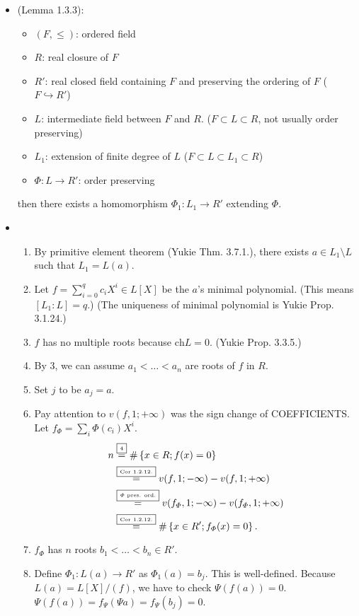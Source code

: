 \documentclass[9pt]{ltjsarticle}
\begin{document}
\begin{itemize}
  \item (Lemma 1.3.3):
  \begin{itemize}
    \item $(F,\le)$: ordered field
    \item $R$: real closure of $F$
    \item $R'$: real closed field containing $F$ and preserving the ordering of $F$
    ($F \hookrightarrow R'$)
    \item $L$: intermediate field between $F$ and $R$.
    ($F \subset L \subset R$, not usually order preserving)
    \item $L_1$: extension of finite degree of $L$
    ($F \subset L \subset L_1 \subset R$)
    \item $\varPhi \colon L\to R'$: order preserving
  \end{itemize}
  then there exists a homomorphism $\varPhi_1 \colon L_1 \to R'$ extending $\varPhi$.
  \item
  \pf
  \begin{enumerate}
    \item By primitive element theorem (Yukie Thm. 3.7.1.),
    there exists $a\in L_1 \setminus L$ such that $L_1 = L(a)$.
    \item
    Let $f = \sum_{i=0}^q c_i X^i \in L[X]$ be the $a$'s minimal polynomial.
    (This means $[L_1:L]=q$.)
    (The uniqueness of minimal polynomial is Yukie Prop. 3.1.24.)
    \item
    $f$ has no multiple roots because $\mathrm{ch} L =0 $.  (Yukie Prop. 3.3.5.)
    \item
    By 3, we can assume $a_1 < \dots < a_n$ are roots of $f$ in $R$.
    \item
    Set $j$ to be $a_j = a$.
    \item
    Pay attention to $v(f,1;+\infty)$ was the sign change of COEFFICIENTS.
    Let $f_\varPhi = \sum_i \varPhi(c_i)X^i$.
    \begin{align}
      n &\overset{\text{\fbox{\tiny 4}}}{=} \#\left\{x\in R; f(x)=0\right\}\\
      &\overset{\text{\fbox{\tiny Cor 1.2.12.}}}{=} v(f,1;-\infty) - v(f,1;+\infty)\\
      &\overset{\text{\fbox{\tiny $\varPhi$ pres. ord.}}}{=}
      v(f_\varPhi,1;-\infty) - v(f_\varPhi,1;+\infty)\\
      &\overset{\text{\fbox{\tiny Cor 1.2.12.}}}{=}
      \# \left\{x\in R'; f_\varPhi(x)=0\right\}.
    \end{align}
    \item
    $f_\varPhi$ has $n$ roots $b_1 < \dots < b_n \in R'$.
    \item
    Define $\varPhi_1\colon L(a)\to R'$ as $\varPhi_1(a) = b_j$.
    This is well-defined.  \pf
    Because $L(a) = L[X]/(f)$, we have to check
    $\Psi(f(a)) = 0$.  $\Psi(f(a)) = f_\Psi(\Psi a) = f_\Psi(b_j) = 0$.
  \end{enumerate}
\end{itemize}
\end{document}
